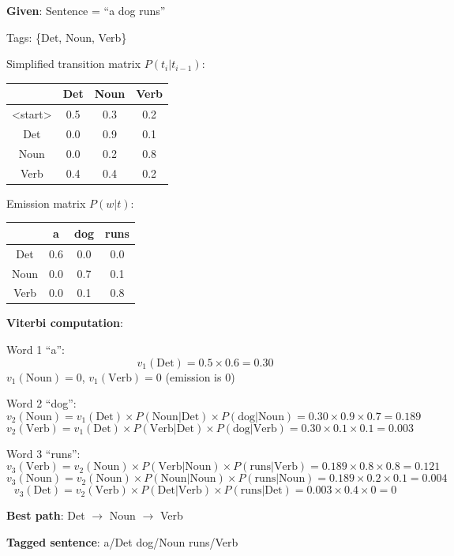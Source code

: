 \documentclass[11pt,a4paper]{article}
\begin{document}
\begin{tcolorbox}[colback=green!5!white,colframe=green!75!black,title=\textbf{Worked Example 30: HMM Tagging with Two Tags}]
\textbf{Given}: Sentence = ``a dog runs''

Tags: \{Det, Noun, Verb\}

Simplified transition matrix $P(t_i | t_{i-1})$:
\begin{center}
\begin{tabular}{|c|ccc|}
\hline
 & Det & Noun & Verb \\ \hline
<start> & 0.5 & 0.3 & 0.2 \\ \hline
Det & 0.0 & 0.9 & 0.1 \\ \hline
Noun & 0.0 & 0.2 & 0.8 \\ \hline
Verb & 0.4 & 0.4 & 0.2 \\ \hline
\end{tabular}
\end{center}

Emission matrix $P(w | t)$:
\begin{center}
\begin{tabular}{|c|ccc|}
\hline
 & a & dog & runs \\ \hline
Det & 0.6 & 0.0 & 0.0 \\ \hline
Noun & 0.0 & 0.7 & 0.1 \\ \hline
Verb & 0.0 & 0.1 & 0.8 \\ \hline
\end{tabular}
\end{center}

\textbf{Viterbi computation}:

Word 1 ``a'':
\[
v_1(\text{Det}) = 0.5 \times 0.6 = 0.30
\]
$v_1(\text{Noun}) = 0$, $v_1(\text{Verb}) = 0$ (emission is 0)

Word 2 ``dog'':
\[
v_2(\text{Noun}) = v_1(\text{Det}) \times P(\text{Noun}|\text{Det}) \times P(\text{dog}|\text{Noun}) = 0.30 \times 0.9 \times 0.7 = 0.189
\]
\[
v_2(\text{Verb}) = v_1(\text{Det}) \times P(\text{Verb}|\text{Det}) \times P(\text{dog}|\text{Verb}) = 0.30 \times 0.1 \times 0.1 = 0.003
\]

Word 3 ``runs'':
\[
v_3(\text{Verb}) = v_2(\text{Noun}) \times P(\text{Verb}|\text{Noun}) \times P(\text{runs}|\text{Verb}) = 0.189 \times 0.8 \times 0.8 = 0.121
\]
\[
v_3(\text{Noun}) = v_2(\text{Noun}) \times P(\text{Noun}|\text{Noun}) \times P(\text{runs}|\text{Noun}) = 0.189 \times 0.2 \times 0.1 = 0.004
\]
\[
v_3(\text{Det}) = v_2(\text{Verb}) \times P(\text{Det}|\text{Verb}) \times P(\text{runs}|\text{Det}) = 0.003 \times 0.4 \times 0 = 0
\]

\textbf{Best path}: Det $\to$ Noun $\to$ Verb

\textbf{Tagged sentence}: a/Det dog/Noun runs/Verb
\end{tcolorbox}
\end{document}
